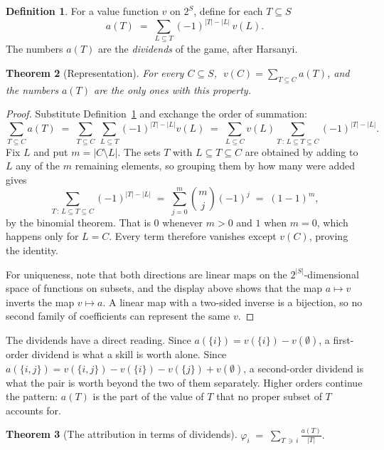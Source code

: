 \documentclass[11pt]{article}
\theoremstyle{plain}
\newtheorem{theorem}{Theorem}
\theoremstyle{definition}
\newtheorem{definition}[theorem]{Definition}
\theoremstyle{remark}
\begin{document}
\begin{definition}\label{def:mobius}
For a value function $v$ on $2^S$, define for each $T \subseteq S$
\[
a(T) \;=\; \sum_{L \subseteq T} (-1)^{|T| - |L|}\, v(L).
\]
The numbers $a(T)$ are the \emph{dividends} of the game, after Harsanyi.
\end{definition}

\begin{theorem}[Representation]\label{thm:mobius}
For every $C \subseteq S$, $\;v(C) = \sum_{T \subseteq C} a(T)$, and the numbers $a(T)$ are the only ones with this property.
\end{theorem}

\begin{proof}
Substitute Definition~\ref{def:mobius} and exchange the order of summation:
\[
\sum_{T \subseteq C} a(T) \;=\; \sum_{T \subseteq C}\ \sum_{L \subseteq T} (-1)^{|T|-|L|} v(L) \;=\; \sum_{L \subseteq C} v(L) \sum_{T \,:\, L \subseteq T \subseteq C} (-1)^{|T|-|L|}.
\]
Fix $L$ and put $m = |C \setminus L|$. The sets $T$ with $L \subseteq T \subseteq C$ are obtained by adding to $L$ any of the $m$ remaining elements, so grouping them by how many were added gives
\[
\sum_{T \,:\, L \subseteq T \subseteq C} (-1)^{|T|-|L|} \;=\; \sum_{j=0}^{m} \binom{m}{j} (-1)^{j} \;=\; (1-1)^{m},
\]
by the binomial theorem. That is $0$ whenever $m > 0$ and $1$ when $m = 0$, which happens only for $L = C$. Every term therefore vanishes except $v(C)$, proving the identity.

For uniqueness, note that both directions are linear maps on the $2^{|S|}$-dimensional space of functions on subsets, and the display above shows that the map $a \mapsto v$ inverts the map $v \mapsto a$. A linear map with a two-sided inverse is a bijection, so no second family of coefficients can represent the same $v$.
\end{proof}

The dividends have a direct reading. Since $a(\{i\}) = v(\{i\}) - v(\emptyset)$, a first-order dividend is what a skill is worth alone. Since $a(\{i,j\}) = v(\{i,j\}) - v(\{i\}) - v(\{j\}) + v(\emptyset)$, a second-order dividend is what the pair is worth beyond the two of them separately. Higher orders continue the pattern: $a(T)$ is the part of the value of $T$ that no proper subset of $T$ accounts for.

\begin{theorem}[The attribution in terms of dividends]\label{thm:shapmobius}
$\displaystyle \varphi_i \;=\; \sum_{T \,\ni\, i} \frac{a(T)}{|T|}.$
\end{theorem}
\end{document}
